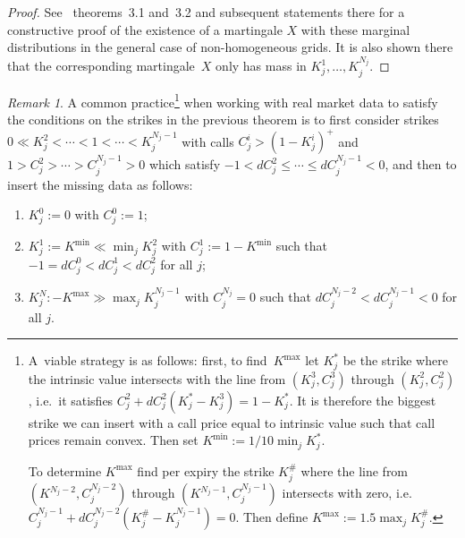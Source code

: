 \documentclass[twoside]{article}
\theoremstyle{plain}
\theoremstyle{definition}
\theoremstyle{remark}
\newtheorem{remark}[theorem]{Remark}
\begin{document}
\noindent
\begin{proof}
See~\cite{DLV} theorems~3.1 and~3.2 and subsequent statements there for a constructive proof of the existence of a martingale $X$ with these marginal distributions in the  general case of non-homogeneous grids.
 It is also shown there that the corresponding martingale~$X$ only has mass in $K^1_j,\ldots,K^{N_j}_j$.
\end{proof}

\begin{remark}\label{rem:extendstrikes}
A common practice\footnote{
        A~viable strategy is as follows: first, to find~$K^{\max}$ let $K^*_j$ be the strike where the intrinsic value intersects with the line from $(K^3_j,C^3_j)$ through $(K^2_j,C^2_j)$, 
        i.e.~it satisfies $C^2_j+dC^2_j (K^*_j-K^3_j) = 1-K^*_j$.
         It is therefore the biggest strike we can insert with a call price equal to
        intrinsic value such that call prices remain convex. Then set $K^{\min} := 1/10 \min_j K^*_j$.
        
        To determine $K^{\max}$ find per expiry the strike $K^\#_j$ where the line from $(K^{N_j-2},C^{N_j-2}_j)$ through $(K^{N_j-1},C^{N_j-1}_j)$ intersects with zero, i.e.~$C^{N_j-1}_j + dC^{N_j-2}_j ( K^\#_j - K^{N_j-1}_j) = 0$.
        Then define $K^{\max}:=1.5 \max_j K^\#_j$.
} when working with real market data to satisfy the conditions on the strikes
in the previous theorem is to first consider strikes $0\ll K^2_j<\cdots<1<\cdots<K_j^{N_j-1}$ with calls $C^i_j > (1-K_j^i)^+$ and $1>C^2_j>\cdots > C^{N_j-1}_j>0$
which satisfy $-1 < dC^2_j \leq \cdots \leq dC_j^{N_j-1} < 0$,
and then to insert the missing data as follows:
\begin{enumerate}
    \item $K^0_j:=0$ with $C^0_j:=1$;
    \item $K^1_j := K^{\min} \ll \min_j K^2_j$ with $C^1_j:=1-K^{\min}$ such that $-1=dC^0_j < dC^1_j < dC^2_j$ for all $j$;
    \item $K^N_j :- K^{\max} \gg \max_j K^{N_j-1}_j$ with $C_j^{N_j}=0$ such that $dC^{N_j-2}_j < dC_j^{N_j-1} < 0$ for all $j$.
\end{enumerate}
\end{remark}
\end{document}
